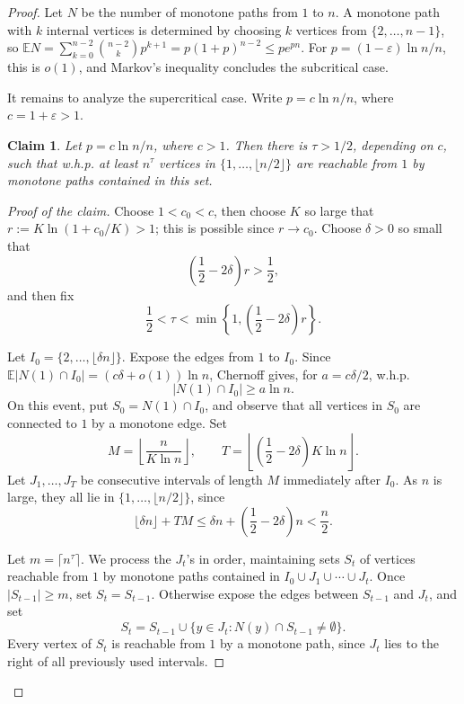 \documentclass[10pt,a4paper]{amsart}
\newtheorem{claim}{Claim}
\newcommand{\EE}{\mathbb{E}}
\begin{document}
\begin{proof}
Let \(N\) be the number of monotone paths from \(1\) to \(n\). A monotone path
with \(k\) internal vertices is determined by choosing \(k\) vertices from
\(\{2,\ldots,n-1\}\), so
\(\EE N=\sum_{k=0}^{n-2}\binom{n-2}{k}p^{k+1}=p(1+p)^{n-2}\le p e^{pn}\).
For \(p=(1-\varepsilon)\ln n/n\), this is \(o(1)\), and Markov's inequality
concludes the subcritical case.

\noindent It remains to analyze the supercritical case.
Write \(p=c\ln n/n\), where \(c=1+\varepsilon>1\).

\begin{claim}\label{clm:one-sided-growth}
Let \(p=c\ln n/n\), where \(c>1\). Then there is \(\tau>1/2\), depending
on \(c\), such that w.h.p. at least \(n^\tau\) vertices in
\(\{1,\ldots,\lfloor n/2\rfloor\}\) are reachable from \(1\) by monotone paths
contained in this set.
\end{claim}

\begin{proof}[Proof of the claim]
Choose \(1<c_0<c\), then choose \(K\) so large that
\(r:=K\ln(1+c_0/K)>1\); this is possible since \(r\to c_0\). Choose
\(\delta>0\) so small that
\[
    \left(\frac12-2\delta\right)r>\frac12,
\]
and then fix
\[
    \frac12<\tau<\min\left\{1,\left(\frac12-2\delta\right)r\right\}.
\]

Let \(I_0=\{2,\ldots,\lfloor\delta n\rfloor\}\). Expose the edges from \(1\) to
\(I_0\). Since \(\EE |N(1)\cap I_0|=(c\delta+o(1))\ln n\), Chernoff gives,
for \(a=c\delta/2\), w.h.p.
\[
    |N(1)\cap I_0|\ge a\ln n .
\]
On this event, put \(S_0=N(1)\cap I_0\), and observe that all vertices in
\(S_0\) are connected to \(1\) by a monotone edge. Set
\[
    M=\left\lfloor \frac{n}{K\ln n}\right\rfloor,
    \qquad
    T=\left\lfloor\left(\frac12-2\delta\right)K\ln n\right\rfloor .
\]
Let \(J_1,\ldots,J_T\) be consecutive intervals of length \(M\) immediately
after \(I_0\). As \(n\) is large, they all lie in
\(\{1,\ldots,\lfloor n/2\rfloor\}\), since
\[
    \lfloor\delta n\rfloor+TM
    \le \delta n+\left(\frac12-2\delta\right)n
    <\frac n2 .
\]

Let \(m=\lceil n^\tau\rceil\). We process the \(J_t\)'s in order, maintaining
sets \(S_t\) of vertices reachable from \(1\) by monotone paths contained in
\(I_0\cup J_1\cup\cdots\cup J_t\). Once \(|S_{t-1}|\ge m\), set
\(S_t=S_{t-1}\). Otherwise expose the edges between \(S_{t-1}\) and \(J_t\),
and set
\[
    S_t=S_{t-1}\cup\{y\in J_t: N(y)\cap S_{t-1}\ne\emptyset\}.
\]
Every vertex of \(S_t\) is reachable from \(1\) by a monotone path, since
\(J_t\) lies to the right of all previously used intervals.


\end{proof}
\end{proof}
\end{document}
